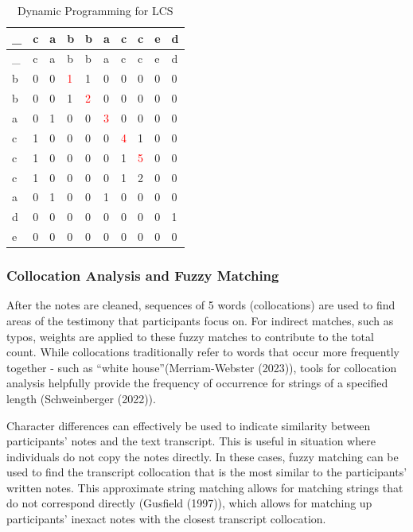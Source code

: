 \documentclass[print]{nuthesis}
\begin{document}
\begin{longtable}[]{@{}llllllllll@{}}
\caption{Dynamic Programming for LCS \label{tab:dylcs}}\tabularnewline
\toprule\noalign{}
\_ & c & a & b & b & a & c & c & e & d \\
\midrule\noalign{}
\endfirsthead
\toprule\noalign{}
\_ & c & a & b & b & a & c & c & e & d \\
\midrule\noalign{}
\endhead
\bottomrule\noalign{}
\endlastfoot
b & 0 & 0 & \textcolor{red}{1} & 1 & 0 & 0 & 0 & 0 & 0 \\
b & 0 & 0 & 1 & \textcolor{red}{2} & 0 & 0 & 0 & 0 & 0 \\
a & 0 & 1 & 0 & 0 & \textcolor{red}{3} & 0 & 0 & 0 & 0 \\
c & 1 & 0 & 0 & 0 & 0 & \textcolor{red}{4} & 1 & 0 & 0 \\
c & 1 & 0 & 0 & 0 & 0 & 1 & \textcolor{red}{5} & 0 & 0 \\
c & 1 & 0 & 0 & 0 & 0 & 1 & 2 & 0 & 0 \\
a & 0 & 1 & 0 & 0 & 1 & 0 & 0 & 0 & 0 \\
d & 0 & 0 & 0 & 0 & 0 & 0 & 0 & 0 & 1 \\
e & 0 & 0 & 0 & 0 & 0 & 0 & 0 & 0 & 0 \\
\end{longtable}

\hypertarget{collocation-analysis-and-fuzzy-matching}{%
\subsubsection{Collocation Analysis and Fuzzy Matching}\label{collocation-analysis-and-fuzzy-matching}}

After the notes are cleaned, sequences of 5 words (collocations) are used to find areas of the testimony that participants focus on.
For indirect matches, such as typos, weights are applied to these fuzzy matches to contribute to the total count.
While collocations traditionally refer to words that occur more frequently together - such as ``white house''(Merriam-Webster (2023)), tools for collocation analysis helpfully provide the frequency of occurrence for strings of a specified length (Schweinberger (2022)).

Character differences can effectively be used to indicate similarity between participants' notes and the text transcript.
This is useful in situation where individuals do not copy the notes directly.
In these cases, fuzzy matching can be used to find the transcript collocation that is the most similar to the participants' written notes.
This approximate string matching allows for matching strings that do not correspond directly (Gusfield (1997)), which allows for matching up participants' inexact notes with the closest transcript collocation.
\end{document}
